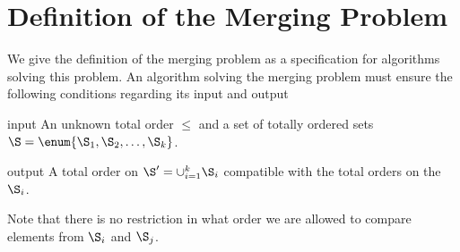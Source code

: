 \section{Definition of the Merging Problem}
\label{tree:merging:def}

We give the definition of the merging problem as a specification for algorithms
solving this problem.
An algorithm solving the merging problem must ensure the following conditions
regarding its input and output
\begin{problem}[Merging]\mbox{}
\begin{steps}
\item[input] An unknown total order \(\le\) and a set of totally ordered
sets \(\S = \enum{\S_1, \S_2, \ldots, \S_k}\).
\item[output] A total order on \(\S' = \cup_{i=1}^{k} \S_i\) compatible with
the total orders on the \(\S_i\).
\end{steps}
\end{problem}
Note that there is no restriction in what order we are allowed to compare
elements from \(\S_i\) and \(\S_j\).
